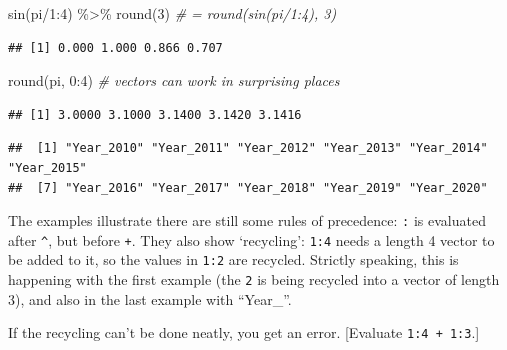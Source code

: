 \documentclass[
]{book}
\newenvironment{Shaded}{\begin{snugshade}}{\end{snugshade}}
\newcommand{\CommentTok}[1]{\textcolor[rgb]{0.56,0.35,0.01}{\textit{#1}}}
\newcommand{\DecValTok}[1]{\textcolor[rgb]{0.00,0.00,0.81}{#1}}
\newcommand{\FunctionTok}[1]{\textcolor[rgb]{0.00,0.00,0.00}{#1}}
\newcommand{\NormalTok}[1]{#1}
\newcommand{\SpecialCharTok}[1]{\textcolor[rgb]{0.00,0.00,0.00}{#1}}
\newcommand{\StringTok}[1]{\textcolor[rgb]{0.31,0.60,0.02}{#1}}
\begin{document}
\begin{Shaded}
\begin{Highlighting}[]
\FunctionTok{sin}\NormalTok{(pi}\SpecialCharTok{/}\DecValTok{1}\SpecialCharTok{:}\DecValTok{4}\NormalTok{) }\SpecialCharTok{\%\textgreater{}\%} \FunctionTok{round}\NormalTok{(}\DecValTok{3}\NormalTok{)  }\CommentTok{\# = round(sin(pi/1:4), 3)}
\end{Highlighting}
\end{Shaded}

\begin{verbatim}
## [1] 0.000 1.000 0.866 0.707
\end{verbatim}

\begin{Shaded}
\begin{Highlighting}[]
\FunctionTok{round}\NormalTok{(pi, }\DecValTok{0}\SpecialCharTok{:}\DecValTok{4}\NormalTok{) }\CommentTok{\# vectors can work in surprising places}
\end{Highlighting}
\end{Shaded}

\begin{verbatim}
## [1] 3.0000 3.1000 3.1400 3.1420 3.1416
\end{verbatim}

\begin{Shaded}
\end{Shaded}

\begin{verbatim}
##  [1] "Year_2010" "Year_2011" "Year_2012" "Year_2013" "Year_2014" "Year_2015"
##  [7] "Year_2016" "Year_2017" "Year_2018" "Year_2019" "Year_2020"
\end{verbatim}

The examples illustrate there are still some rules of precedence: \texttt{:} is evaluated after \texttt{\^{}}, but before \texttt{+}. They also show `recycling': \texttt{1:4} needs a length 4 vector to be added to it, so the values in \texttt{1:2} are recycled. Strictly speaking, this is happening with the first example (the \texttt{2} is being recycled into a vector of length 3), and also in the last example with ``Year\_''.

If the recycling can't be done neatly, you get an error. {[}Evaluate \texttt{1:4\ +\ 1:3}.{]}
\end{document}
